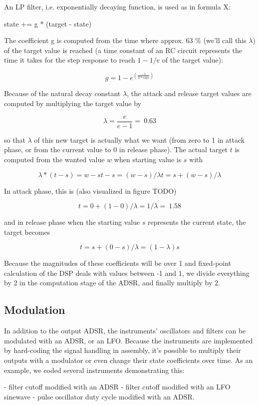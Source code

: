 \documentclass[10pt,a4paper,oneside]{article}
\begin{document}
An LP filter, i.e. exponentially decaying function, is used as in formula X:

 state += g * (target - state)

The coefficient g is computed from the time where approx. 63 \% (we'll call this $\lambda$) of the target value is reached (a time constant of an RC circuit represents the time it takes for the step response to reach $1-1/e$ of the target value):

\[
 g = 1 - e^(\frac{-1}{T * rate})
\]

Because of the natural decay constant $\lambda$, the attack and release target values are computed by multiplying the target value by

\[
 \lambda = \frac{e}{e-1} = ~0.63
\]

so that $\lambda$ of this new target is actually what we want (from zero to 1 in attack phase, or from the current value to 0 in release phase). The actual target $t$ is computed from the wanted value $w$ when starting value is $s$ with

\[
 \lambda * (t - s) = w - s
 t - s = (w - s) / \lambda
 t = s + (w - s) / \lambda
\]

In attack phase, this is (also visualized in figure TODO)

\[
 t = 0 + (1 - 0) / \lambda
   = 1 / \lambda = ~1.58
\]

and in release phase when the starting value $s$ represents the current state, the target becomes

\[
 t = s + (0 - s) / \lambda
   = (1 - \lambda) s
\]

Because the magnitudes of these coefficients will be over 1 and fixed-point calculation of the DSP deals with values between -1 and 1, we divide everything by 2 in the computation stage of the ADSR, and finally multiply by 2.


\subsection{Modulation}

In addition to the output ADSR, the instruments' oscillators and filters can be modulated with an ADSR, or an LFO. Because the instruments are implemented by hard-coding the signal handling in assembly, it's possible to multiply their outputs with a modulator or even change their state coefficients over time. As an example, we coded several instruments demonstrating this:

- filter cutoff modified with an ADSR
- filter cutoff modified with an LFO sinewave
- pulse oscillator duty cycle modified with an ADSR.
\end{document}
